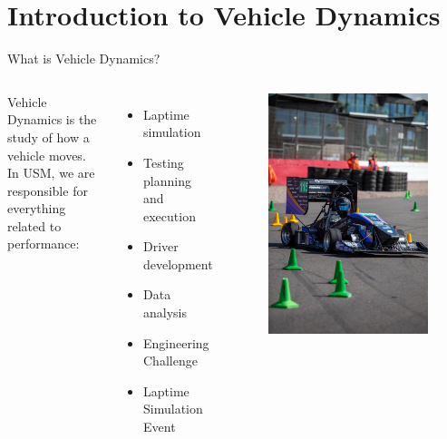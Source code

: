 \section*{Introduction to Vehicle Dynamics}

\begin{frame}{What is Vehicle Dynamics?}
    \begin{columns}
        Vehicle Dynamics is the study of how a vehicle moves. \\
        \vspace*{2ex}
        In USM, we are responsible for everything related to performance:
        \begin{itemize}
            \item Laptime simulation
            \item Testing planning and execution
            \item Driver development
            \item Data analysis
            \item Engineering Challenge
            \item Laptime Simulation Event
        \end{itemize}
        \begin{figure}
            \includegraphics[width=\textwidth]{../../res/car/FSUK Cornering.jpg}

\end{figure}
\end{columns}
\end{frame}
